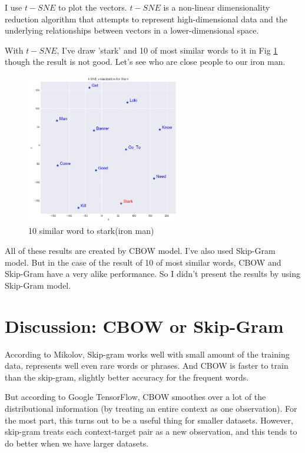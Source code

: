 \documentclass[a4paper,10pt]{article}
\begin{document}
I use $t-SNE$\cite{maaten2008visualizing} to plot the vectors. $t-SNE$ is a non-linear dimensionality reduction algorithm that attempts to represent high-dimensional data and the underlying relationships between vectors in a lower-dimensional space.

With $t-SNE$, I've draw 'stark' and 10 of most similar words to it in Fig \ref{Fig.result-stark} though the result is not good. Let's see who are close people to our iron man.
\begin{figure}[htpb]
\centering 
\includegraphics[width=0.6\textwidth]{report_image/result-stark.png} 
\caption{10 similar word to stark(iron man)} 
\label{Fig.result-stark} 
\end{figure}
 
All of these results are created by CBOW model. I've also used Skip-Gram model. But in the case of the result of 10 of most similar words, CBOW and Skip-Gram have a very alike performance. So I didn't present the results by using Skip-Gram model.

\section{Discussion: CBOW or Skip-Gram}
According to Mikolov, Skip-gram works well with small amount of the training data, represents well even rare words or phrases. And CBOW is faster to train than the skip-gram, slightly better accuracy for the frequent words.


But according to Google TensorFlow, CBOW smoothes over a lot of the distributional information (by treating an entire context as one observation). For the most part, this turns out to be a useful thing for smaller datasets. However, skip-gram treats each context-target pair as a new observation, and this tends to do better when we have larger datasets. 
\end{document}
